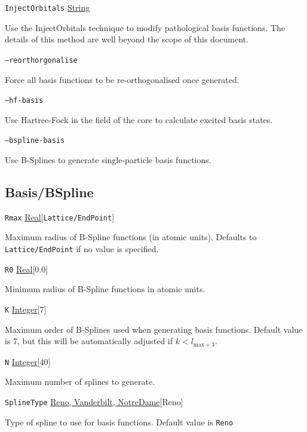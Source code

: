 \documentclass{report}
\begin{document}
\texttt{InjectOrbitals} \uline{String}
\begin{adjustwidth}{1cm}{}
Use the InjectOrbitals technique to modify pathological basis functions. The details of this method are
well beyond the scope of this document.
\end{adjustwidth}

\texttt{--reorthorgonalise}
\begin{adjustwidth}{1cm}{}
Force all basis functions to be re-orthogonalised once generated.
\end{adjustwidth}

\texttt{--hf-basis}
\begin{adjustwidth}{1cm}{}
Use Hartree-Fock in the field of the core to calculate excited basis states.
\end{adjustwidth}

\texttt{--bspline-basis} 
\begin{adjustwidth}{1cm}{}
Use B-Splines to generate single-particle basis functions.
\end{adjustwidth}

\subsection{Basis/BSpline}

\texttt{Rmax} \uline{Real}[\texttt{Lattice/EndPoint}]
\begin{adjustwidth}{1cm}{}
Maximum radius of B-Spline functions (in atomic units). Defaults to \texttt{Lattice/EndPoint} if no 
value is specified.
\end{adjustwidth}

\texttt{R0} \uline{Real}[0.0]
\begin{adjustwidth}{1cm}{}
Minimum radius of B-Spline functions in atomic units. 
\end{adjustwidth}

\texttt{K} \uline{Integer}[7]
\begin{adjustwidth}{1cm}{}
Maximum order of B-Splines used when generating basis functions. Default value is 7, but this will be
automatically adjusted if $k < l_{\mathrm{max} + 3}$.
\end{adjustwidth}

\texttt{N} \uline{Integer}[40]
\begin{adjustwidth}{1cm}{}
Maximum number of splines to generate.
\end{adjustwidth}

\texttt{SplineType} \uline{Reno, Vanderbilt, NotreDame}[Reno]
\begin{adjustwidth}{1cm}{}
Type of spline to use for basis functions. Default value is \texttt{Reno}
\end{adjustwidth}
\end{document}
